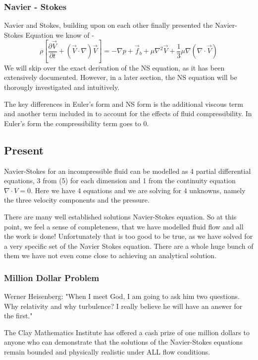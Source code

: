 \documentclass[12pt]{article}
\begin{document}
\subsubsection{Navier - Stokes}
Navier and Stokes, building upon on each other finally presented the Navier-Stokes Equation \cite{bib4} we know of - 
\begin{equation}
    \rho [ \frac{\partial \Vec{V}}{\partial t} + (\Vec{V} \cdot \nabla)\Vec{V}] = - \nabla p + \Vec{f}_{b} + \mu \nabla^{2} \Vec{V} + \frac{1}{3}\mu \nabla (\nabla \cdot \Vec{V})
\end{equation}
We will skip over the exact derivation of the NS equation, as it has been extensively documented. However, in a later section, the NS equation will be thorougly investigated and intuitively.

The key differences in Euler's form and NS form is the additional viscous term and another term included in to account for the effects of fluid compressibility. In Euler's form the compressibility term goes to 0.
\subsection{Present}
Navier-Stokes for an incompressible fluid can be modelled as 4 partial differential equations, 3 from (5) for each dimension and 1 from the continuity equation $ \nabla \cdot V = 0$. Here we have 4 equations and we are solving for 4 unknowns, namely the three velocity components and the pressure.

There are many well established solutions Navier-Stokes equation. So at this point, we feel a sense of completeness, that we have modelled fluid flow and all the work is done! Unfortunately that is too good to be true, as we have solved for a very specific set of the Navier Stokes equation. There are a whole huge bunch of them we have not even come close to achieving an analytical solution. 

\subsubsection{Million Dollar Problem}

Werner Heisenberg: "When I meet God, I am going to ask him two questions. Why relativity and why turbulence? I really believe he will have an answer for the first."

The Clay Mathematics Institute \cite{bib5} has offered a cash prize of one million dollars to anyone who can demonstrate that the solutions of the Navier-Stokes equations remain bounded and physically realistic under ALL flow conditions. 
\end{document}
